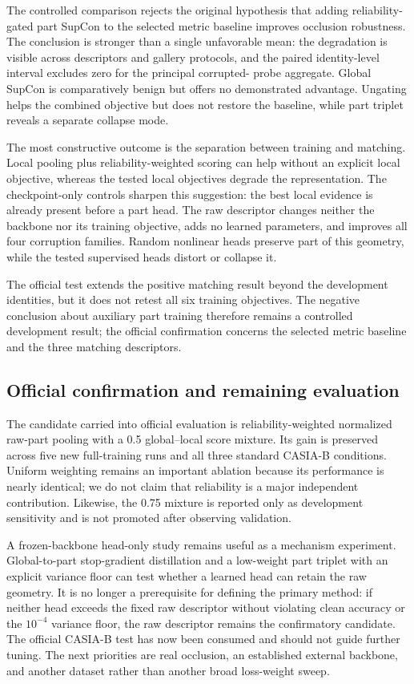 \documentclass[runningheads]{llncs}
\begin{document}
The controlled comparison rejects the original hypothesis that adding
reliability-gated part SupCon to the selected metric baseline improves
occlusion robustness. The conclusion is stronger than a single unfavorable
mean: the degradation is visible across descriptors and gallery protocols, and
the paired identity-level interval excludes zero for the principal corrupted-
probe aggregate. Global SupCon is comparatively benign but offers no
demonstrated advantage. Ungating helps the combined objective but does not
restore the baseline, while part triplet reveals a separate collapse mode.

The most constructive outcome is the separation between training and matching.
Local pooling plus reliability-weighted scoring can help without an explicit
local objective, whereas the tested local objectives degrade the representation.
The checkpoint-only controls sharpen this suggestion: the best local evidence
is already present before a part head. The raw descriptor changes neither the
backbone nor its training objective, adds no learned parameters, and improves
all four corruption families. Random nonlinear heads preserve part of this
geometry, while the tested supervised heads distort or collapse it.

The official test extends the positive matching result beyond the development
identities, but it does not retest all six training objectives. The negative
conclusion about auxiliary part training therefore remains a controlled
development result; the official confirmation concerns the selected metric
baseline and the three matching descriptors.

\subsection{Official confirmation and remaining evaluation}

The candidate carried into official evaluation is reliability-weighted
normalized raw-part pooling with a 0.5 global--local score mixture. Its gain is
preserved across five new full-training runs and all three standard CASIA-B
conditions. Uniform weighting remains an important ablation because its
performance is nearly identical; we do not claim that reliability is a major
independent contribution. Likewise, the 0.75 mixture is reported only as
development sensitivity and is not promoted after observing validation.

A frozen-backbone head-only study remains useful as a mechanism experiment.
Global-to-part stop-gradient distillation and a low-weight part triplet with an
explicit variance floor can test whether a learned head can retain the raw
geometry. It is no longer a prerequisite for defining the primary method: if
neither head exceeds the fixed raw descriptor without violating clean accuracy
or the $10^{-4}$ variance floor, the raw descriptor remains the confirmatory
candidate. The official CASIA-B test has now been consumed and should not guide
further tuning. The next priorities are real occlusion, an established external
backbone, and another dataset rather than another broad loss-weight sweep.
\end{document}

